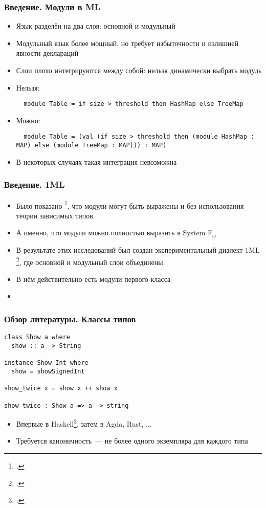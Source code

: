 \documentclass{beamer}
\begin{document}
\lstset{language=caml}
\begin{frame}[fragile]\frametitle{Введение. Модули в ML}
\begin{itemize}
  \item Язык разделён на два слоя: основной и модульный
  \item Модульный язык более мощный, но требует избыточности и излишней явности деклараций
  \item Слои плохо интегрируются между собой: нельзя динамически выбрать модуль
  \item Нельзя: \begin{lstlisting}
  module Table = if size > threshold then HashMap else TreeMap
  \end{lstlisting}
  \item Можно: \begin{lstlisting}
  module Table = (val (if size > threshold then (module HashMap : MAP) else (module TreeMap : MAP))) : MAP)
  \end{lstlisting}
  \item В некоторых случаях такая интеграция невозможна
\end{itemize}
\end{frame}

\begin{frame}\frametitle{Введение. 1ML}
\begin{itemize}
  \item Было показано \footcite{fing}, что модули могут быть выражены и без использования теории зависимых типов
  \item А именно, что модули можно полностью выразить в System F\textsubscript{$\omega$}
  \item В результате этих исследований был создан экспериментальный диалект 1ML \footcite{1ml}, где основной и модульный слои объединены
  \item В нём действительно есть модули первого класса
  \item 
\end{itemize}
\end{frame}

\lstset{language=haskell}
\begin{frame}[fragile]\frametitle{Обзор литературы. Классы типов}
\begin{lstlisting}
class Show a where
  show :: a -> String

instance Show Int where
  show = showSignedInt

show_twice x = show x ++ show x

show_twice : Show a => a -> string
\end{lstlisting}
\begin{itemize}
  \item Впервые в Haskell\footcite{adhoc}, затем в Agda, Rust, ...
  \item Требуется каноничность~--- не более одного экземпляра для каждого типа
\end{itemize}
\end{frame}
\end{document}
